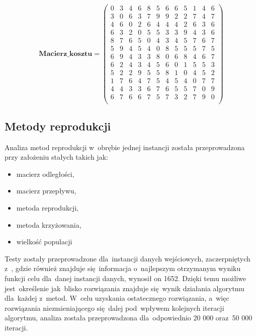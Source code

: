 \par
$$
\mathbf{Macierz\_kosztu} =
\left( \begin{array}{cccccccccccc}
0&3&4&6&8&5&6&6&5&1&4&6\\
3&0&6&3&7&9&9&2&2&7&4&7\\
4&6&0&2&6&4&4&4&2&6&3&6\\
6&3&2&0&5&5&3&3&9&4&3&6\\
8&7&6&5&0&4&3&4&5&7&6&7\\
5&9&4&5&4&0&8&5&5&5&7&5\\
6&9&4&3&3&8&0&6&8&4&6&7\\
6&2&4&3&4&5&6&0&1&5&5&3\\
5&2&2&9&5&5&8&1&0&4&5&2\\
1&7&6&4&7&5&4&5&4&0&7&7\\
4&4&3&3&6&7&6&5&5&7&0&9\\
6&7&6&6&7&5&7&3&2&7&9&0\\
\end{array} \right)
$$

\subsection{Metody reprodukcji}\label{reprodukcja}

Analiza metod reprodukcji w~obrębie jednej instancji została przeprowadzona przy założeniu stałych takich jak:
\begin{itemize}
\item
macierz odległości, 
\item 
macierz przepływu,
\item
metoda reprodukcji,
\item
metoda krzyżowania,
\item
wielkość populacji
\end{itemize}
\par
\vspace{0,4cm}
Testy zostały przeprowadzone dla~instancji danych wejściowych, zaczerpniętych z~\cite{qaplib}, gdzie również znajduje się~informacja o~najlepszym otrzymanym wyniku funkcji celu dla~danej instancji danych, wynosił on 1652. Dzięki temu możliwe jest~określenie jak~blisko rozwiązania znajduje się~wynik działania algorytmu dla~każdej z~metod. W~celu uzyskania ostatecznego rozwiązania, a~więc rozwiązania niezmieniającego się~dalej pod~wpływem kolejnych iteracji algorytmu, analiza została przeprowadzona dla~odpowiednio 20 000 oraz~50 000 iteracji.\\



